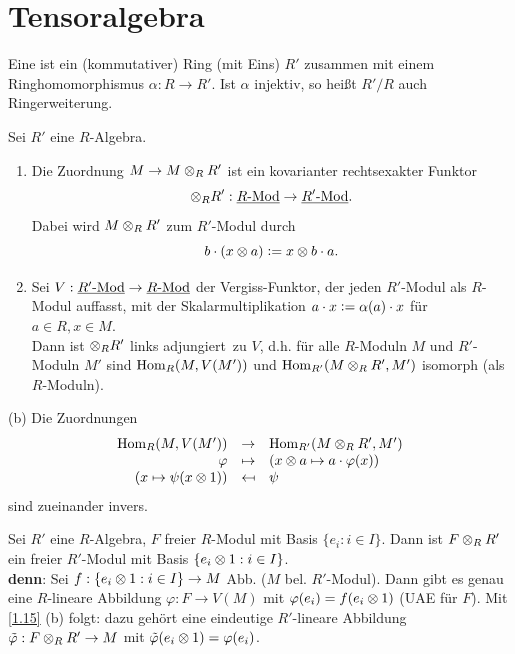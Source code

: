 \documentclass[a4paper, 10pt]{report}
\begin{document}
\begin{Bew}
\begin{enumerate}
\end{enumerate}
\end{Bew}

\section{Tensoralgebra}

\begin{Def}
\label{1.14}
Eine  ist ein (kommutativer) Ring (mit Eins) $R'$
zusammen mit einem Ringhomomorphismus $\alpha: R\to R'$.
Ist $\alpha$ injektiv, so hei\ss t $R'/R$ auch Ringerweiterung.
\end{Def}

\begin{Bem}
\label{1.15}
Sei $R'$ eine $R$-Algebra.
\begin{enumerate}
\item Die Zuordnung $M\to M\ten[R] R'$ ist ein kovarianter rechtsexakter Funktor
\[
\ten[R] R':\KatRMod\to \KatRMod[R'].
\]
Dabei wird $M\ten[R] R'$ zum $R'$-Modul durch
\[
b\cdot (x\ten a)\defeqr x\ten b\cdot a.
\]
\item Sei $V: \KatRMod[R']\to \KatRMod$ der \glqq Vergiss-Funktor\grqq, der
jeden $R'$-Modul als 
$R$-Modul auffasst, mit der Skalarmultiplikation $a\cdot x\defeqr\alpha(a)\cdot x$
f\"ur $a\in R, x\in M$.\\
Dann ist $\ten[R] R'$ \glqq links adjungiert\grqq\ zu $V$, d.h. f\"ur alle 
$R$-Moduln $M$ und $R'$-Moduln $M'$ sind $\Hom[R]{M}{V(M')}$ und 
$\Hom[{R'}]{M\ten[R] R'}{M'}$ isomorph (als $R$-Moduln).
\end{enumerate}
\end{Bem}

\begin{Bew}
\item[(b)] Die Zuordnungen $$\begin{array}{rcl}
\Hom[R]{M}{V(M')} & \to & \Hom[R']{M\ten[R] R'}{M'}\\
\varphi & \mapsto & (x\ten a\mapsto a\cdot \varphi(x))\\
(x\mapsto \psi(x\ten 1))&\mapsfrom & \psi \\
\end{array}$$
sind zueinander invers.
\end{Bew}

\begin{nnBsp}
Sei $R'$ eine $R$-Algebra, $F$ freier $R$-Modul mit Basis $\{e_i:i\in I\}$. Dann ist $F\ten[R] R'$ ein freier
$R'$-Modul mit Basis $\{e_i\ten 1:i\in I\}$.\\
\textbf{denn}: Sei $f:\{e_i\ten 1: i\in I\} \to M$ Abb. ($M$ bel. $R'$-Modul).
Dann gibt es genau eine $R$-lineare Abbildung $\varphi: F\to V(M)$ mit $\varphi(e_i)=f(e_i\ten 1)$ (UAE f\"ur $F$).
Mit \ref{1.15} (b) folgt: dazu geh\"ort eine eindeutige $R'$-lineare Abbildung
$\tilde\varphi: F\ten[R] R'\to M$ mit $\tilde\varphi(e_i\ten 1)=\varphi(e_i)$.
\end{nnBsp}
\end{document}
